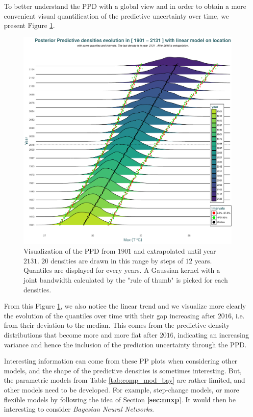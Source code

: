  To better understand the PPD with a global view and in order to obtain a more convenient visual quantification of the predictive uncertainty over time, we present Figure \ref{fig:post_pred}.

 \begin{figure}[!htb]
  	\centering	\includegraphics[width=0.8\linewidth]{predpred.pdf}\caption{Visualization of the PPD from $1901$ and extrapolated until year $2131$. $20$ densities are drawn in this range by steps of $12$ years. Quantiles are displayed for every years.  A Gaussian kernel with a joint bandwidth calculated by the \citet[pp.48, (3.31)]{silverman_1986} "rule of thumb" is picked for each densities.}\label{fig:post_pred}
 \end{figure}
  
  From this Figure \ref{fig:post_pred},  we also notice the linear trend and we visualize more clearly the evolution of the quantiles over time with their gap increasing after $2016$, i.e. from their deviation to the median. This comes from the predictive density distributions that become more and more flat after $2016$, indicating an increasing variance and hence the inclusion of the prediction uncertainty through the PPD. 

Interesting information can come from these PP plots when considering other models, and the shape of the predictive densities is sometimes interesting. But, the parametric models from Table \ref{tab:comp_mod_bay} are rather limited, and other models need to be developed. For example, step-change models, or more flexible models by following the idea of \hyperref[sec:nnxp]{Section \textbf{\ref{sec:nnxp}}}. It would then be interesting to consider \emph{Bayesian Neural Networks}.

